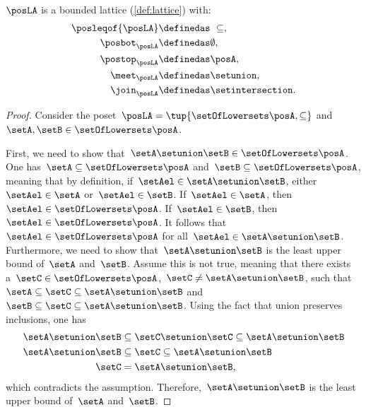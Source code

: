 \begin{lemma}
	$\posLA$ is a bounded lattice (\cref{def:lattice}) with:
	\begin{equation}
		\begin{aligned}
			\posleqof{\posLA} & \definedas \ \subseteq, \\
			\posbot_{\posLA}  & \definedas \emptyset,   \\
			\postop_{\posLA}  & \definedas \posA,       \\
			\meet_{\posLA}     & \definedas \setunion,        \\
			\join_{\posLA}   & \definedas \setintersection.
		\end{aligned}
	\end{equation}
\end{lemma}
\begin{proof}
	Consider the poset~$\posLA=\tup{\setOfLowersets \posA,\subseteq}$ and~$\setA,\setB\in \setOfLowersets \posA$.

	First, we need to show that~$\setA\setunion \setB\in \setOfLowersets \posA$.
	One has~$\setA \subseteq \setOfLowersets \posA$ and~$\setB\subseteq \setOfLowersets \posA$, meaning that by definition, if~$\setAel\in \setA\setunion \setB$, either~$\setAel\in \setA$ or~$\setAel\in \setB$.
	If~$\setAel\in \setA$, then~$\setAel\in \setOfLowersets \posA$.
	If~$\setAel\in \setB$, then~$\setAel\in \setOfLowersets \posA$.
	It follows that~$\setAel\in \setOfLowersets \posA$ for all~$\setAel\in \setA\setunion \setB$.
	Furthermore, we need to show that~$\setA\setunion \setB$ is the least upper bound of~$\setA$ and~$\setB$.
	Assume this is not true, meaning that there exists a~$\setC\in \setOfLowersets \posA$,~$\setC\neq \setA\setunion \setB$, such that~$\setA\subseteq \setC\subseteq \setA\setunion \setB$ and~$\setB\subseteq \setC\subseteq \setA\setunion \setB$.
	Using the fact that union preserves inclusions, one has
	\begin{equation}
		\begin{aligned}
			\setA\setunion \setB & \subseteq \setC\setunion \setC \subseteq \setA\setunion \setB \\
			\setA\setunion \setB & \subseteq \setC \subseteq \setA\setunion \setB           \\
			\setC           & = \setA\setunion \setB,
		\end{aligned}
	\end{equation}
	which contradicts the assumption.
	Therefore,~$\setA\setunion \setB$ is the least upper bound of~$\setA$ and~$\setB$.


\end{proof}

